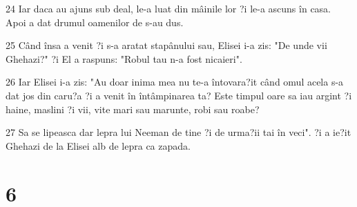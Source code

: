 \par 24 Iar daca au ajuns sub deal, le-a luat din mâinile lor ?i le-a ascuns în casa. Apoi a dat drumul oamenilor de s-au dus.
\par 25 Când însa a venit ?i s-a aratat stapânului sau, Elisei i-a zis: "De unde vii Ghehazi?" ?i El a raspuns: "Robul tau n-a fost nicaieri".
\par 26 Iar Elisei i-a zis: "Au doar inima mea nu te-a întovara?it când omul acela s-a dat jos din caru?a ?i a venit în întâmpinarea ta? Este timpul oare sa iau argint ?i haine, maslini ?i vii, vite mari sau marunte, robi sau roabe?
\par 27 Sa se lipeasca dar lepra lui Neeman de tine ?i de urma?ii tai în veci". ?i a ie?it Ghehazi de la Elisei alb de lepra ca zapada.

\chapter{6}


